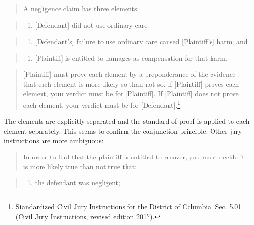\documentclass[
  10pt,
  dvipsnames,enabledeprecatedfontcommands]{scrartcl}
\providecommand{\tightlist}{%
  \setlength{\itemsep}{0pt}\setlength{\parskip}{0pt}}
\begin{document}
\begin{quote}
A negligence claim has three elements:
\end{quote}

\begin{quote}
\begin{enumerate}
\def\labelenumi{\arabic{enumi}.}
\tightlist
\item
  {[}Defendant{]} did not use ordinary care;
\end{enumerate}
\end{quote}

\begin{quote}
\begin{enumerate}
\def\labelenumi{\arabic{enumi}.}
\setcounter{enumi}{1}
\tightlist
\item
  {[}Defendant's{]} failure to use ordinary care caused
  {[}Plaintiff's{]} harm; and
\end{enumerate}
\end{quote}

\begin{quote}
\begin{enumerate}
\def\labelenumi{\arabic{enumi}.}
\setcounter{enumi}{2}
\tightlist
\item
  {[}Plaintiff{]} is entitled to damages as compensation for that harm.
\end{enumerate}
\end{quote}

\begin{quote}
{[}Plaintiff{]} must prove each element by a preponderance of the
evidence---that each element is more likely so than not so. If
{[}Plaintiff{]} proves each element, your verdict must be for
{[}Plaintiff{]}. If {[}Plaintiff{]} does not prove each element, your
verdict must be for {[}Defendant{]}.\footnote{Standardized Civil Jury
  Instructions for the District of Columbia, Sec. 5.01 (Civil Jury
  Instructions, revised edition 2017).}
\end{quote}

\noindent The elements are explicitly separated and the standard of
proof is applied to each element separately. This seems to confirm the
conjunction principle. Other jury instructions are more ambiguous:

\begin{quote}
In order to find that the plaintiff is entitled to recover, you must
decide it is more likely true than not true that:
\end{quote}

\begin{quote}
\begin{enumerate}
\def\labelenumi{\arabic{enumi}.}
\tightlist
\item
  the defendant was negligent;
\end{enumerate}
\end{quote}
\end{document}
